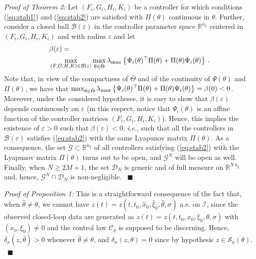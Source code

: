 \documentclass[letterpaper, 10 pt, conference]{ieeetran}
\def\qedp{\hspace*{\fill}~{\tiny $\blacksquare$}}
\begin{document}
{\em Proof of Theorem 2:} 
Let $(F_i,G_i,H_i,K_i)$ be a controller for which conditions (\ref{eq:stab1}) and (\ref{eq:stab2}) are satisfied with $\Pi (\theta)$ continuous in $\theta$. 
Further, consider a closed ball $\mathcal B (\varepsilon)$ in the controller parameter space $\mathbb R^{\bar n_\xi}$ centered in $(F_i,G_i,H_i,K_i)$ and with radius $\varepsilon$
and let 
\[
\begin{split}
& \beta (\varepsilon)  = \\
& \max_{(F,G,H,K) \in \mathcal B (\varepsilon)} \max_{\theta \in \bar \Theta } \lambda_{\rm max} 
\left \{  \Psi_i (\theta)^\top \Pi (\theta) + \Pi(\theta) \Psi_i (\theta) \right \} \, .
\end{split}
\]
Note that, in view of the compactness of  $\bar \Theta$ and of the continuity of $\Psi (\theta)$ and $\Pi (\theta)$, we have that $\max_{\theta \in \bar \Theta } \lambda_{\rm max} 
\left \{  \Psi_i (\theta)^\top \Pi (\theta) + \Pi(\theta) \Psi_i (\theta) \right \} = \beta(0) < 0$. Moreover, under the considered hypotheses, it is easy to show that 
$\beta (\varepsilon) $ depends continuously on $\varepsilon$ (in this respect, notice that 
$\Psi_i (\theta)$ is an affine function of the controller matrices $(F_i,G_i,H_i,K_i)$).
Hence, this implies  the existence of $\varepsilon >0$ such that $\beta (\varepsilon) <0$, 
\emph{i.e.}, such that  all the controllers in $ \mathcal B (\varepsilon)$ satisfies 
(\ref{eq:stab2}) with the same Lyapunov matrix $\Pi (\theta)$. As a consequence, the set 
$\mathcal G \subset \mathbb R^{\bar n_\xi}$ of all controllers satisfying (\ref{eq:stab2})  with the 
Lyapunov matrix $\Pi (\theta)$ turns out to be open, and $\mathcal G^N$ will be open as well. Finally, when $N \ge 2 M +1$, the set $\mathcal D_N$ is generic and
of full measure on $\mathbb R^{N \, \bar n_\xi}$ and, hence, $\mathcal G^N \cap \mathcal D_N$ is non-negligible.
\qedp

{\em Proof of Proposition 1:} This  is a straightforward consequence of the fact that, when $ \hat \theta \ne \theta$, we cannot have 
$z(t) = z(t, t_0, \hat x_0, \hat \xi_0, \hat \theta , \sigma )$ a.e. on $\mathcal I$, since the 
observed closed-loop data are generated as $z(t) = z(t, t_0, x_0, \xi_0, \theta , \sigma )$ with $(x_0,\xi_0) \ne 0$
and the control law $\mathcal C_\sigma$ is supposed to be discerning. Hence, $\delta_\sigma(z,\hat \theta) > 0$ whenever
$\hat \theta \ne \theta$, and $\delta_\sigma(z,\theta) = 0$ since by hypothesis $z \in \mathcal S_\sigma (\theta)$.
\qedp
\end{document}
